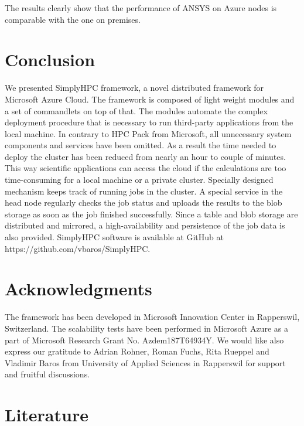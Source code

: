 \documentclass[3p,times]{elsarticle}
\begin{document}
The results clearly show that the performance of ANSYS on Azure nodes is comparable with the one on premises.


\section{Conclusion}
\label{sec:conclusions}

We presented SimplyHPC framework, a novel distributed framework for Microsoft Azure Cloud. The framework is composed of light weight modules and a set of commandlets on top of that. The modules automate the complex deployment procedure that is necessary to run third-party applications from the local machine. In contrary to HPC Pack from Microsoft, all unnecessary system components and services have been omitted. As a result the time needed to deploy the cluster has been reduced from nearly an hour to couple of minutes.  This way scientific applications can access the cloud if the calculations are too time-consuming for a local machine or a private cluster. Specially designed mechanism keeps track of running jobs in the cluster. A special service in the head node regularly checks the job status and uploads the results to the blob storage as soon as the job finished successfully. Since a table and blob storage are distributed and mirrored, a high-availability and persistence of the job data is also provided. SimplyHPC software is available at GitHub at https://github.com/vbaros/SimplyHPC.



\section{Acknowledgments}
\label{sec:ackn}

The framework has been developed in Microsoft Innovation Center in Rapperswil, Switzerland. The scalability tests have been performed in Microsoft Azure as a part of Microsoft Research Grant No. Azdem187T64934Y. We would like also express our gratitude to Adrian Rohner, Roman Fuchs, Rita Rueppel and Vladimir Baros from University of Applied Sciences in Rapperswil for support and fruitful discussions.

\section{Literature}
\label{sec:literature}



\end{document}
